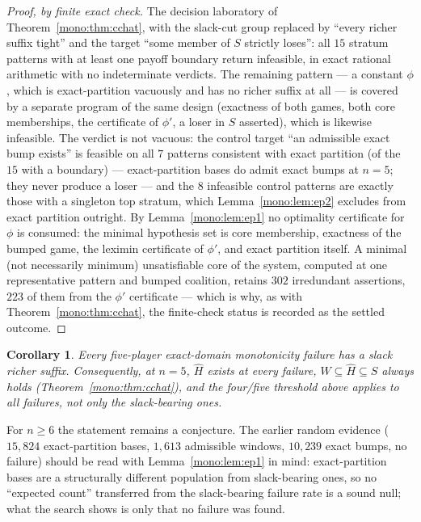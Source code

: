 \documentclass[11pt]{article}
\newtheorem{corollary}[theorem]{Corollary}
\begin{document}
\begin{proof}[Proof, by finite exact check]
The decision laboratory of Theorem~\ref{mono:thm:cchat}, with the slack-cut
group replaced by ``every richer suffix tight'' and the target ``some
member of $S$ strictly loses'': all $15$ stratum patterns with at least
one payoff boundary return
infeasible, in exact rational arithmetic with no indeterminate verdicts.
The remaining pattern --- a constant $\phi$, which is exact-partition
vacuously and has no richer suffix at all --- is covered by a separate
program of the same design (exactness of both games, both core
memberships, the certificate of $\phi'$, a loser in $S$ asserted), which
is likewise infeasible.
The verdict is not vacuous: the control target ``an admissible exact bump
exists'' is feasible on all $7$ patterns consistent with exact
partition (of the $15$ with a boundary) --- exact-partition bases do
admit exact bumps at $n=5$; they
never produce a loser --- and the $8$ infeasible control patterns are
exactly those with a singleton top stratum, which
Lemma~\ref{mono:lem:ep2} excludes from exact partition outright.  By
Lemma~\ref{mono:lem:ep1} no optimality certificate for $\phi$ is consumed:
the minimal hypothesis set is core membership, exactness of the bumped
game, the leximin certificate of $\phi'$, and exact partition itself.
A minimal (not necessarily minimum) unsatisfiable core of the system,
computed at one representative pattern and bumped coalition, retains
$302$ irredundant assertions, $223$ of them from the $\phi'$ certificate
--- which is why, as with Theorem~\ref{mono:thm:cchat}, the finite-check
status is recorded as the settled outcome.
\end{proof}

\begin{corollary}\label{mono:cor:allfail}
Every five-player exact-domain monotonicity failure has a slack richer
suffix.  Consequently, at $n=5$, $\widehat H$ exists at every failure,
$W\subseteq\widehat H\subseteq S$ always holds
(Theorem~\ref{mono:thm:cchat}), and the four/five threshold above applies
to \emph{all} failures, not only the slack-bearing ones.
\end{corollary}

For $n\ge6$ the statement remains a conjecture.  The earlier random
evidence ($15{,}824$ exact-partition bases, $1{,}613$ admissible windows,
$10{,}239$ exact bumps, no failure) should be read with
Lemma~\ref{mono:lem:ep1} in mind: exact-partition bases are a
structurally different population from slack-bearing ones, so no
``expected count'' transferred from the slack-bearing failure rate is a
sound null; what the search shows is only that no failure was found.
\end{document}
